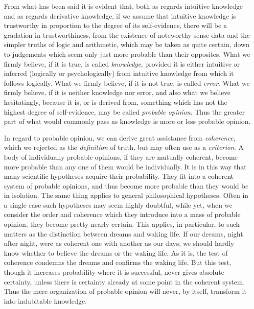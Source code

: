 \documentclass[oneside,letterpaper,12pt]{book}
\begin{document}
From what has been said it is evident that, both as regards intuitive
knowledge and as regards derivative knowledge, if we assume that
intuitive knowledge is trustworthy in proportion to the degree of its
self-evidence, there will be a gradation in trustworthiness, from the
existence of noteworthy sense-data and the simpler truths of logic and
arithmetic, which may be taken as quite certain, down to judgements
which seem only just more probable than their opposites. \label{firm} What we firmly
believe, if it is true, is called \emph{knowledge}, provided it is
either intuitive or inferred (logically or psychologically) from
intuitive knowledge from which it follows logically. What we firmly
believe, if it is not true, is called \emph{error}. \label{hesitatingly} What we firmly
believe, if it is neither knowledge nor error, and also what we believe
hesitatingly, because it is, or is derived from, something which has not
the highest degree of self-evidence, may be called \emph{probable
opinion}. Thus the greater part of what would commonly pass as knowledge
is more or less probable opinion. \label{probable}

In regard to probable opinion, we can derive great assistance from
\emph{coherence}, which we rejected as the \emph{definition} of truth,
but may often use as a \emph{criterion}. A body of individually probable
opinions, if they are mutually coherent, become more probable than any
one of them would be individually. It is in this way that many
scientific hypotheses acquire their probability. They fit into a
coherent system of probable opinions, and thus become more probable than
they would be in isolation. The same thing applies to general
philosophical hypotheses. Often in a single case such hypotheses may
seem highly doubtful, while yet, when we consider the order and
coherence which they introduce into a mass of probable opinion, they
become pretty nearly certain. This applies, in particular, to such
matters as the distinction between dreams and waking life. If our
dreams, night after night, were as coherent one with another as our
days, we should hardly know whether to believe the dreams or the waking
life. As it is, the test of coherence condemns the dreams and confirms
the waking life. But this test, though it increases probability where it
is successful, never gives absolute certainty, unless there is certainty
already at some point in the coherent system. Thus the mere organization
of probable opinion will never, by itself, transform it into indubitable
knowledge.

\protect\hypertarget{link2HCH0014}{}{}
\end{document}
